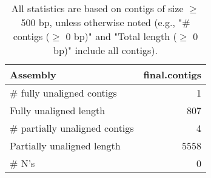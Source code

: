 \documentclass[12pt,a4paper]{article}
\begin{document}
\begin{table}[ht]
\begin{center}
\caption{All statistics are based on contigs of size $\geq$ 500 bp, unless otherwise noted (e.g., "\# contigs ($\geq$ 0 bp)" and "Total length ($\geq$ 0 bp)" include all contigs).}
\begin{tabular}{|l*{1}{|r}|}
\hline
Assembly & final.contigs \\ \hline
\# fully unaligned contigs & 1 \\ \hline
Fully unaligned length & 807 \\ \hline
\# partially unaligned contigs & 4 \\ \hline
Partially unaligned length & 5558 \\ \hline
\# N's & 0 \\ \hline
\end{tabular}
\end{center}
\end{table}
\end{document}
